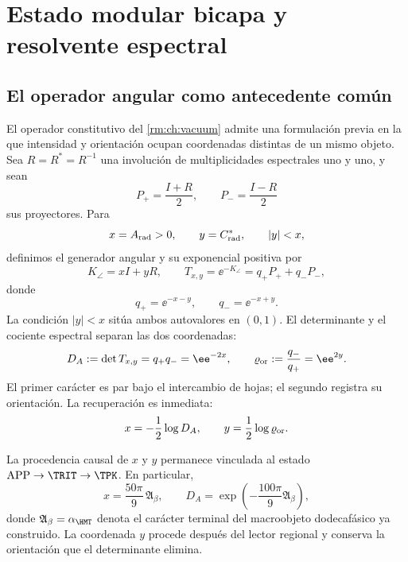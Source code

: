\chapter{Estado modular bicapa y resolvente espectral}
\label{rm:chap:estado-modular-resolvente}

\section{El operador angular como antecedente com\'un}

El operador constitutivo del \cref{rm:ch:vacuum} admite una formulaci\'on
previa en la que intensidad y orientaci\'on ocupan coordenadas distintas de
un mismo objeto. Sea \(R=R^*=R^{-1}\) una involuci\'on de multiplicidades
espectrales uno y uno, y sean
\begin{equation}
 P_+=\frac{I+R}{2},
 \qquad
 P_-=\frac{I-R}{2}
 \label{rm:eq:modular-projectors}
\end{equation}
sus proyectores. Para
\begin{equation}
 x=A_{\rm rad}>0,
 \qquad
 y=C^*_{\rm rad},
 \qquad
 |y|<x,
 \label{rm:eq:modular-domain}
\end{equation}
definimos el generador angular y su exponencial positiva por
\begin{equation}
 K_{\angle}=xI+yR,
 \qquad
 T_{x,y}=\ee^{-K_{\angle}}
 =q_+P_++q_-P_-,
 \label{rm:eq:modular-angular-operator}
\end{equation}
donde
\begin{equation}
 q_+=\ee^{-x-y},
 \qquad
 q_-=\ee^{-x+y}.
 \label{rm:eq:modular-qpm}
\end{equation}
La condici\'on \(|y|<x\) sit\'ua ambos autovalores en \((0,1)\). El
determinante y el cociente espectral separan las dos coordenadas:
\begin{equation}
 D_A:=\det T_{x,y}=q_+q_-=\ee^{-2x},
 \qquad
 \varrho_{\rm or}:=\frac{q_-}{q_+}=\ee^{2y}.
 \label{rm:eq:modular-determinant-ratio}
\end{equation}
El primer car\'acter es par bajo el intercambio de hojas; el segundo registra
su orientaci\'on. La recuperaci\'on es inmediata:
\begin{equation}
 x=-\frac12\log D_A,
 \qquad
 y=\frac12\log\varrho_{\rm or}.
 \label{rm:eq:modular-recover-xy}
\end{equation}

La procedencia causal de \(x\) y \(y\) permanece vinculada al estado
\(\mathrm{APP}\to\TRIT\to\TPK\). En particular,
\begin{equation}
 x=\frac{50\pi}{9}\,\mathfrak A_\beta,
 \qquad
 D_A=\exp\!\left(-\frac{100\pi}{9}\mathfrak A_\beta\right),
 \label{rm:eq:modular-alpha-determinant}
\end{equation}
donde \(\mathfrak A_\beta=\alpha_{\HMT}\) denota el car\'acter terminal del
macroobjeto dodecaf\'asico ya construido. La coordenada \(y\) procede despu\'es
del lector regional y conserva la orientaci\'on que el determinante elimina.

